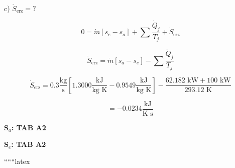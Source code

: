 c) $\dot{S}_{\text{erz}} = ?$

\[
0 = \dot{m} \left[ s_e - s_a \right] + \sum \frac{\dot{Q}_j}{T_j} + \dot{S}_{\text{erz}}
\]

\[
\dot{S}_{\text{erz}} = \dot{m} \left[ s_a - s_e \right] - \sum \frac{\dot{Q}_j}{T_j}
\]

\[
\dot{S}_{\text{erz}} = 0.3 \frac{\text{kg}}{\text{s}} \left[ 1.3000 \frac{\text{kJ}}{\text{kg K}} - 0.9549 \frac{\text{kJ}}{\text{kg K}} \right] - \frac{62.182 \text{ kW} + 100 \text{ kW}}{293.12 \text{ K}}
\]

\[
= -0.0234 \frac{\text{kJ}}{\text{K s}}
\]

\textbf{S$_a$: TAB A2}

\textbf{S$_e$: TAB A2}

``````latex